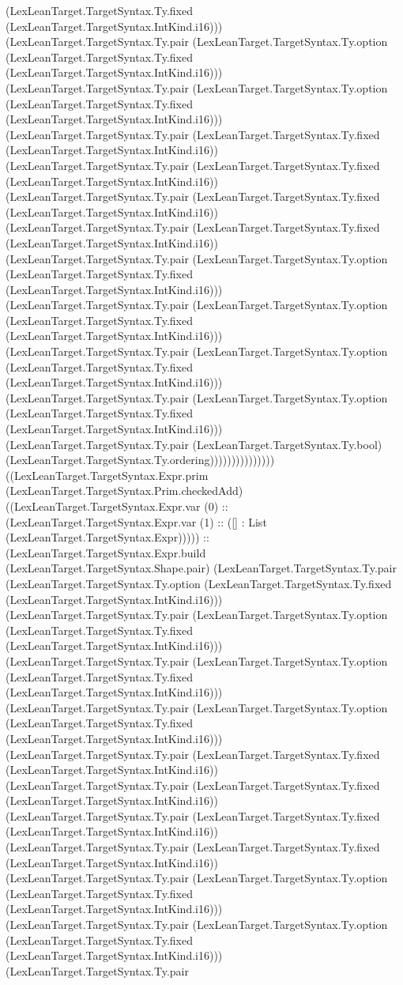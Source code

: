\documentclass[11pt]{article}
\begin{document}
(LexLeanTarget.TargetSyntax.Ty.fixed (LexLeanTarget.TargetSyntax.IntKind.i16))) (LexLeanTarget.TargetSyntax.Ty.pair (LexLeanTarget.TargetSyntax.Ty.option (LexLeanTarget.TargetSyntax.Ty.fixed (LexLeanTarget.TargetSyntax.IntKind.i16))) (LexLeanTarget.TargetSyntax.Ty.pair (LexLeanTarget.TargetSyntax.Ty.option (LexLeanTarget.TargetSyntax.Ty.fixed (LexLeanTarget.TargetSyntax.IntKind.i16))) (LexLeanTarget.TargetSyntax.Ty.pair (LexLeanTarget.TargetSyntax.Ty.fixed (LexLeanTarget.TargetSyntax.IntKind.i16)) (LexLeanTarget.TargetSyntax.Ty.pair (LexLeanTarget.TargetSyntax.Ty.fixed (LexLeanTarget.TargetSyntax.IntKind.i16)) (LexLeanTarget.TargetSyntax.Ty.pair (LexLeanTarget.TargetSyntax.Ty.fixed (LexLeanTarget.TargetSyntax.IntKind.i16)) (LexLeanTarget.TargetSyntax.Ty.pair (LexLeanTarget.TargetSyntax.Ty.fixed (LexLeanTarget.TargetSyntax.IntKind.i16)) (LexLeanTarget.TargetSyntax.Ty.pair (LexLeanTarget.TargetSyntax.Ty.option (LexLeanTarget.TargetSyntax.Ty.fixed (LexLeanTarget.TargetSyntax.IntKind.i16))) (LexLeanTarget.TargetSyntax.Ty.pair (LexLeanTarget.TargetSyntax.Ty.option (LexLeanTarget.TargetSyntax.Ty.fixed (LexLeanTarget.TargetSyntax.IntKind.i16))) (LexLeanTarget.TargetSyntax.Ty.pair (LexLeanTarget.TargetSyntax.Ty.option (LexLeanTarget.TargetSyntax.Ty.fixed (LexLeanTarget.TargetSyntax.IntKind.i16))) (LexLeanTarget.TargetSyntax.Ty.pair (LexLeanTarget.TargetSyntax.Ty.option (LexLeanTarget.TargetSyntax.Ty.fixed (LexLeanTarget.TargetSyntax.IntKind.i16))) (LexLeanTarget.TargetSyntax.Ty.pair (LexLeanTarget.TargetSyntax.Ty.bool) (LexLeanTarget.TargetSyntax.Ty.ordering))))))))))))))) ((LexLeanTarget.TargetSyntax.Expr.prim (LexLeanTarget.TargetSyntax.Prim.checkedAdd) ((LexLeanTarget.TargetSyntax.Expr.var (0) :: (LexLeanTarget.TargetSyntax.Expr.var (1) :: ([] : List (LexLeanTarget.TargetSyntax.Expr))))) :: (LexLeanTarget.TargetSyntax.Expr.build (LexLeanTarget.TargetSyntax.Shape.pair) (LexLeanTarget.TargetSyntax.Ty.pair (LexLeanTarget.TargetSyntax.Ty.option (LexLeanTarget.TargetSyntax.Ty.fixed (LexLeanTarget.TargetSyntax.IntKind.i16))) (LexLeanTarget.TargetSyntax.Ty.pair (LexLeanTarget.TargetSyntax.Ty.option (LexLeanTarget.TargetSyntax.Ty.fixed (LexLeanTarget.TargetSyntax.IntKind.i16))) (LexLeanTarget.TargetSyntax.Ty.pair (LexLeanTarget.TargetSyntax.Ty.option (LexLeanTarget.TargetSyntax.Ty.fixed (LexLeanTarget.TargetSyntax.IntKind.i16))) (LexLeanTarget.TargetSyntax.Ty.pair (LexLeanTarget.TargetSyntax.Ty.option (LexLeanTarget.TargetSyntax.Ty.fixed (LexLeanTarget.TargetSyntax.IntKind.i16))) (LexLeanTarget.TargetSyntax.Ty.pair (LexLeanTarget.TargetSyntax.Ty.fixed (LexLeanTarget.TargetSyntax.IntKind.i16)) (LexLeanTarget.TargetSyntax.Ty.pair (LexLeanTarget.TargetSyntax.Ty.fixed (LexLeanTarget.TargetSyntax.IntKind.i16)) (LexLeanTarget.TargetSyntax.Ty.pair (LexLeanTarget.TargetSyntax.Ty.fixed (LexLeanTarget.TargetSyntax.IntKind.i16)) (LexLeanTarget.TargetSyntax.Ty.pair (LexLeanTarget.TargetSyntax.Ty.fixed (LexLeanTarget.TargetSyntax.IntKind.i16)) (LexLeanTarget.TargetSyntax.Ty.pair (LexLeanTarget.TargetSyntax.Ty.option (LexLeanTarget.TargetSyntax.Ty.fixed (LexLeanTarget.TargetSyntax.IntKind.i16))) (LexLeanTarget.TargetSyntax.Ty.pair (LexLeanTarget.TargetSyntax.Ty.option (LexLeanTarget.TargetSyntax.Ty.fixed (LexLeanTarget.TargetSyntax.IntKind.i16))) (LexLeanTarget.TargetSyntax.Ty.pair 
\end{document}
